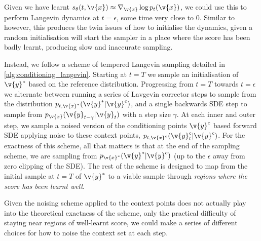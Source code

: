 Given we have learnt $s_\theta(t, \v{x}) \approx \nabla_{\v{x}}\log p_t(\v{x})$, we could use this to perform Langevin dynamics at $t=\epsilon$, some time very close to $0$.
Similar to \cite{song2019generative} however, this produces the twin issues of how to initialise the dynamics, given a random initialisation will start the sampler in a place where the score has been badly learnt, producing slow and inaccurate sampling.

Instead, we follow a scheme of tempered Langevin sampling detailed in \cref{alg:conditioning_langevin}.
Starting at $t=T$ we sample an initialisation of $\v{y}^*$ based on the reference distribution.
Progressing from $t=T$ towards $t=\epsilon$ we alternate between running a series of Lavgevin corrector steps to sample from the distribution $p_{t, \v{x}^*}(\v{y}^* | \v{y}^c)$, and a single backwards SDE step to sample from $p_{\v{x}}(\v{y}_{t-\gamma} | \v{y}_t)$ with a step size $\gamma$.
At each inner and outer step, we sample a noised version of the conditioning points $\v{y}^c$ based forward SDE applying noise to these context points, $p_{t, \v{x}^c}(\v{y}_t^c | \v{y}^c)$.
For the exactness of this scheme, all that matters is that at the end of the sampling scheme, we are sampling from $p_{\v{x}^*}(\v{y}^* | \v{y}^c)$ (up to the $\epsilon$ away from zero clipping of the SDE).
The rest of the scheme is designed to map from the initial sample at $t=T$ of $\v{y}^*$ to a viable sample through \textit{regions where the score has been learnt well}.

Given the noising scheme applied to the context points does not actually play into the theoretical exactness of the scheme, only the practical difficulty of staying near regions of well-learnt score, we could make a series of different choices for how to noise the context set at each step.


